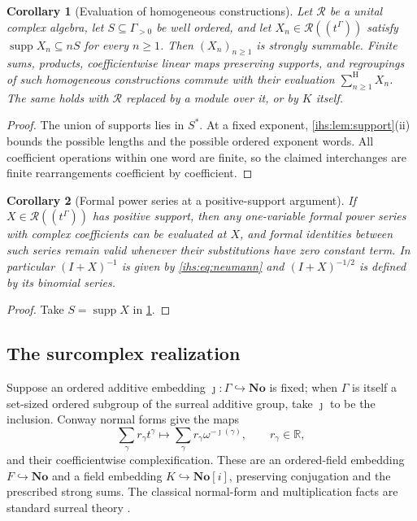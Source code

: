\documentclass[11pt,a4paper]{article}
\numberwithin{equation}{section}
\newtheorem{corollary}[corollary]{Corollary}
\theoremstyle{definition}
\theoremstyle{remark}
\newcommand{\R}{\mathbb R}
\newcommand{\No}{\mathbf{No}}
\newcommand{\K}{K}
\newcommand{\Fld}{F}
\newcommand{\supp}{\operatorname{supp}}
\newcommand{\sH}{\mathop{\sum}\nolimits^{\mathrm H}}
\begin{document}
\begin{corollary}[Evaluation of homogeneous constructions]\label{ihs:cor:evaluate}
Let $\mathscr R$ be a unital complex algebra, let $S\subseteq\Gamma_{>0}$ be
well ordered, and let $X_n\in\mathscr R((t^\Gamma))$ satisfy
$\supp X_n\subseteq nS$ for every $n\ge1$. Then $(X_n)_{n\ge1}$ is strongly
summable. Finite sums, products, coefficientwise linear maps preserving
supports, and regroupings of such homogeneous constructions commute with
their evaluation $\sH_{n\ge1}X_n$. The same holds with $\mathscr R$ replaced
by a module over it, or by $\K$ itself.
\end{corollary}
\begin{proof}
The union of supports lies in $S^*$. At a fixed exponent,
\cref{ihs:lem:support}(ii) bounds the possible lengths and the possible
ordered exponent words. All coefficient operations within one word are
finite, so the claimed interchanges are finite rearrangements coefficient by
coefficient.
\end{proof}

\begin{corollary}[Formal power series at a positive-support argument]\label{ihs:cor:binomial}
If $X\in\mathscr R((t^\Gamma))$ has positive support, then any one-variable
formal power series with complex coefficients can be evaluated at $X$, and
formal identities between such series remain valid whenever their
substitutions have zero constant term. In particular $(I+X)^{-1}$ is given
by \eqref{ihs:eq:neumann} and $(I+X)^{-1/2}$ is defined by its binomial
series.
\end{corollary}
\begin{proof}
Take $S=\supp X$ in \cref{ihs:cor:evaluate}.
\end{proof}

\subsection{The surcomplex realization}\label{ihs:sec:surcomplex}
Suppose an ordered additive embedding $\jmath:\Gamma\hookrightarrow\No$ is
fixed; when $\Gamma$ is itself a set-sized ordered subgroup of the surreal
additive group, take $\jmath$ to be the inclusion. Conway normal forms give
the maps
\begin{equation}\label{ihs:eq:surreal-embedding}
 \sum_\gamma r_\gamma t^\gamma
 \longmapsto\sum_\gamma r_\gamma\omega^{-\jmath(\gamma)},
 \qquad r_\gamma\in\R,
\end{equation}
and their coefficientwise complexification. These are an ordered-field
embedding $\Fld\hookrightarrow\No$ and a field embedding
$\K\hookrightarrow\No[i]$, preserving conjugation and the prescribed strong
sums. The classical normal-form and multiplication facts are standard
surreal theory \cite{Gonshor}.
\end{document}
